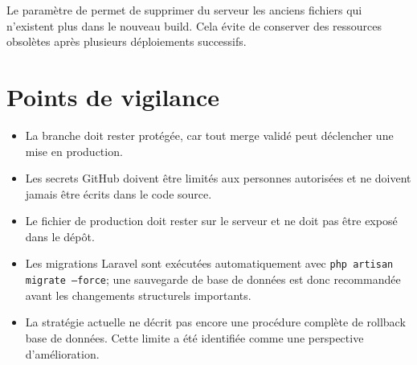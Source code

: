 Le paramètre  de  permet de supprimer du serveur les anciens fichiers qui n'existent plus dans le nouveau build. Cela évite de conserver des ressources obsolètes après plusieurs déploiements successifs.

\section{Points de vigilance}

\begin{itemize}
    \item La branche  doit rester protégée, car tout merge validé peut déclencher une mise en production.
    \item Les secrets GitHub doivent être limités aux personnes autorisées et ne doivent jamais être écrits dans le code source.
    \item Le fichier  de production doit rester sur le serveur et ne doit pas être exposé dans le dépôt.
    \item Les migrations Laravel sont exécutées automatiquement avec \texttt{php artisan migrate --force}; une sauvegarde de base de données est donc recommandée avant les changements structurels importants.
    \item La stratégie actuelle ne décrit pas encore une procédure complète de rollback base de données. Cette limite a été identifiée comme une perspective d'amélioration.
\end{itemize}
